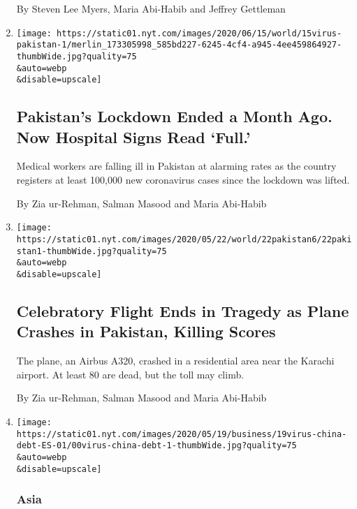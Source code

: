 \begin{enumerate}
  By Steven Lee Myers, Maria Abi-Habib and Jeffrey Gettleman
\item
  \href{/2020/06/15/world/asia/pakistan-coronavirus-hospitals.html}{}

  \texttt{[image: https://static01.nyt.com/images/2020/06/15/world/15virus-pakistan-1/merlin\_173305998\_585bd227-6245-4cf4-a945-4ee459864927-thumbWide.jpg?quality=75\\\&auto=webp\\\&disable=upscale]}

  \hypertarget{pakistans-lockdown-ended-a-month-ago-now-hospital-signs-read-full}{%
  \subsection{Pakistan's Lockdown Ended a Month Ago. Now Hospital Signs
  Read
  `Full.'}\label{pakistans-lockdown-ended-a-month-ago-now-hospital-signs-read-full}}

  Medical workers are falling ill in Pakistan at alarming rates as the
  country registers at least 100,000 new coronavirus cases since the
  lockdown was lifted.

  By Zia ur-Rehman, Salman Masood and Maria Abi-Habib
\item
  \href{/2020/05/22/world/asia/pakistan-plane-crash.html}{}

  \texttt{[image: https://static01.nyt.com/images/2020/05/22/world/22pakistan6/22pakistan1-thumbWide.jpg?quality=75\\\&auto=webp\\\&disable=upscale]}

  \hypertarget{celebratory-flight-ends-in-tragedy-as-plane-crashes-in-pakistan-killing-scores}{%
  \subsection{Celebratory Flight Ends in Tragedy as Plane Crashes in
  Pakistan, Killing
  Scores}\label{celebratory-flight-ends-in-tragedy-as-plane-crashes-in-pakistan-killing-scores}}

  The plane, an Airbus A320, crashed in a residential area near the
  Karachi airport. At least 80 are dead, but the toll may climb.

  By Zia ur-Rehman, Salman Masood and Maria Abi-Habib
\item
  \href{/es/2020/05/19/espanol/mundo/deuda-china-virus.html}{}

  \texttt{[image: https://static01.nyt.com/images/2020/05/19/business/19virus-china-debt-ES-01/00virus-china-debt-1-thumbWide.jpg?quality=75\\\&auto=webp\\\&disable=upscale]}

  \hypertarget{asia}{%
  \subsubsection{Asia}\label{asia}}


\end{enumerate}

